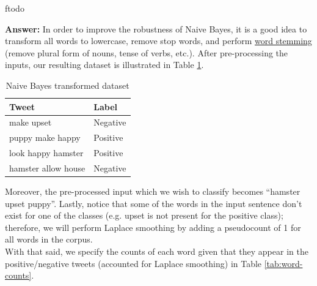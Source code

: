 ƒtodo\documentclass{article}
\newenvironment{QandA}{\begin{enumerate}[label=\arabic*.]}{\end{enumerate}}
\newenvironment{InnerQandA}{\begin{enumerate}[label=\roman*.]}{\end{enumerate}}
\newenvironment{answer}{\par\normalfont \textbf{Answer:}}{}
\begin{document}
\begin{QandA}
\begin{InnerQandA}
        \begin{answer}
        In order to improve the robustness of Naive Bayes, it is a good idea to transform all words to lowercase, remove stop words, and perform \href{https://www.geeksforgeeks.org/python-stemming-words-with-nltk/}{word stemming} (remove plural form of nouns, tense of verbs, etc.). After pre-processing the inputs, our resulting dataset is illustrated in Table \ref{tab:naive-bayes-transformed-dataset}. 
        
        \begin{table}[h!]
        \centering
        \begin{tabular}{|l|l|}
        \hline
        \textbf{Tweet}         & \textbf{Label} \\ \hline
        make upset             & Negative       \\ \hline
        puppy make happy       & Positive       \\ \hline
        look happy hamster     & Positive       \\ \hline
        hamster allow house & Negative       \\ \hline
        \end{tabular}
        \caption{Naive Bayes transformed dataset}
        \label{tab:naive-bayes-transformed-dataset}
        \end{table}
        
        Moreover, the pre-processed input which we wish to classify becomes ``hamster upset puppy''. Lastly, notice that some of the words in the input sentence don't exist for one of the classes (e.g. upset is not present for the positive class); therefore, we will perform Laplace smoothing by adding a pseudocount of 1 for all words in the corpus. \\
        With that said, we specify the counts of each word given that they appear in the positive/negative tweets (accounted for Laplace smoothing) in Table \ref{tab:word-counts}.\\


\end{answer}
\end{InnerQandA}
\end{QandA}
\end{document}
